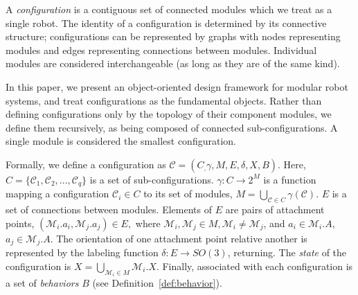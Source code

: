 \documentclass[graybox]{svmult}
\begin{document}
\begin{definition}[Configuration]
\label{def:configuration}
A \textit{configuration} is a contiguous set of connected modules which we treat as a
single robot.  The identity of a configuration is determined by its connective structure; configurations
can be represented by graphs with nodes representing modules and edges
representing connections between modules.   Individual modules
are considered interchangeable (as long as they are of the same kind).

In this paper, we present an object-oriented design framework for modular robot
systems, and treat configurations as the fundamental objects. Rather than defining
configurations only by the topology of their component modules, we define them recursively,
as being composed of connected sub-configurations. A single module is considered the
smallest configuration.

Formally, we define a configuration as $\mathcal{C}=(C_, \gamma, M, E, \delta,
X, B)$.
%
Here, $C=\{\mathcal{C}_{1}, \mathcal{C}_{2}, ..., \mathcal{C}_{q}\}$ is a set of sub-configurations.
%
$\gamma: C \rightarrow 2^M$ is a function {mapping} a configuration \( \mathcal{C}_i \in C\) to its set of modules,  \( M=\bigcup_{\mathcal{C}\in C}{\gamma(\mathcal{C})} \).
%
$E$ is a set of connections between modules. Elements of \(E\) are pairs of
attachment points, $(\mathcal{M}_i.a_i, \mathcal{M}_j.a_j)\in E,$ where $\mathcal{M}_{i},\mathcal{M}_j \in M, \mathcal{M}_i \neq \mathcal{M}_j$, and $a_i\in \mathcal{M}_i.A$, $a_j\in \mathcal{M}_j.A$.
%
The orientation of one attachment point relative another is represented by the
labeling function $\delta: E \rightarrow SO(3)$, returning.
%
The \textit{state} of the configuration is \(X = \bigcup_{\mathcal{M}_i \in M} \mathcal{M}_i.X \).
%
Finally, associated with each configuration is a set of \textit{behaviors} \(B\)
(see Definition~\ref{def:behavior}).


\end{definition}
\end{document}
